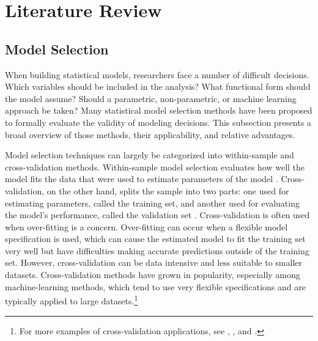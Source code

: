 \documentclass[twocolumn]{article}
\begin{document}
\section{Literature Review}

\subsection{Model Selection}
\label{sec:ModelSelection}

When building statistical models, researchers face a number of difficult decisions. Which variables should be included in the analysis? What functional form should the model assume? Should a parametric, non-parametric, or machine learning approach be taken? Many statistical model selection methods have been proposed to formally evaluate the validity of modeling decisions. This subsection presents a broad overview of those methods, their applicability, and relative advantages.

Model selection techniques can largely be categorized into within-sample and cross-validation methods. Within-sample model selection evaluates how well the model fits the data that were used to estimate parameters of the model \citep{Greene}. Cross-validation, on the other hand, splits the sample into two parts: one used for estimating parameters, called the training set, and another used for evaluating the model's performance, called the validation set \citep{Arlot}. Cross-validation is often used when over-fitting is a concern. Over-fitting can occur when a flexible model specification is used, which can cause the estimated model to fit the training set very well but have difficulties making accurate predictions outside of the training set. However, cross-validation can be data intensive and less suitable to smaller datasets. Cross-validation methods have grown in popularity, especially among machine-learning methods, which tend to use very flexible specifications and are typically applied to large datasets.\footnote{For more examples of cross-validation applications, see \cite{Allen}, \cite{Golub}, and \cite{Kohavi}.}
\end{document}
